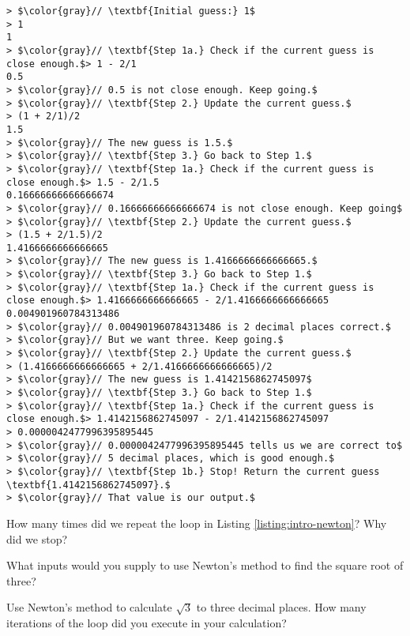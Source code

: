 \begin{lstlisting}[caption={\label{listing:intro-newton}Calculating $\sqrt{2}$
to three decimal places using Newton's Method}, escapeinside=$$]
> $\color{gray}// \textbf{Initial guess:} 1$
> 1
1
> $\color{gray}// \textbf{Step 1a.} Check if the current guess is close enough.$> 1 - 2/1
0.5
> $\color{gray}// 0.5 is not close enough. Keep going.$
> $\color{gray}// \textbf{Step 2.} Update the current guess.$
> (1 + 2/1)/2
1.5
> $\color{gray}// The new guess is 1.5.$
> $\color{gray}// \textbf{Step 3.} Go back to Step 1.$
> $\color{gray}// \textbf{Step 1a.} Check if the current guess is close enough.$> 1.5 - 2/1.5
0.16666666666666674
> $\color{gray}// 0.16666666666666674 is not close enough. Keep going$
> $\color{gray}// \textbf{Step 2.} Update the current guess.$
> (1.5 + 2/1.5)/2
1.4166666666666665
> $\color{gray}// The new guess is 1.4166666666666665.$
> $\color{gray}// \textbf{Step 3.} Go back to Step 1.$
> $\color{gray}// \textbf{Step 1a.} Check if the current guess is close enough.$> 1.4166666666666665 - 2/1.4166666666666665
0.004901960784313486
> $\color{gray}// 0.004901960784313486 is 2 decimal places correct.$
> $\color{gray}// But we want three. Keep going.$
> $\color{gray}// \textbf{Step 2.} Update the current guess.$
> (1.4166666666666665 + 2/1.4166666666666665)/2
> $\color{gray}// The new guess is 1.4142156862745097$
> $\color{gray}// \textbf{Step 3.} Go back to Step 1.$
> $\color{gray}// \textbf{Step 1a.} Check if the current guess is close enough.$> 1.4142156862745097 - 2/1.4142156862745097
> 0.0000042477996395895445
> $\color{gray}// 0.0000042477996395895445 tells us we are correct to$
> $\color{gray}// 5 decimal places, which is good enough.$
> $\color{gray}// \textbf{Step 1b.} Stop! Return the current guess
\textbf{1.4142156862745097}.$
> $\color{gray}// That value is our output.$
\end{lstlisting}

\begin{question}
How many times did we repeat the loop in Listing \ref{listing:intro-newton}? Why
did we stop?
\end{question}

\begin{question}
What inputs would you supply to use Newton's method to find the square root of
three?
\end{question}

\begin{question}
Use Newton's method to calculate $\sqrt{3}$ to three decimal places. How many
iterations of the loop did you execute in your calculation?
\end{question}

